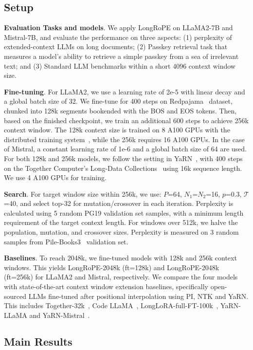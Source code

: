  \label{sec:exp}
\subsection{Setup}
\textbf{Evaluation Tasks and models}. We apply LongRoPE on LLaMA2-7B and Mistral-7B, and evaluate the performance on three aspects: (1) perplexity of extended-context LLMs on long documents; (2) Passkey retrieval task that measures a model's ability to retrieve a simple passkey from a sea of irrelevant text; and (3) Standard LLM benchmarks within a short 4096 context window size. 

\textbf{Fine-tuning}. For LLaMA2, we use a learning rate of 2e-5 with linear decay and a global batch size of 32. We fine-tune for 400 steps on  Redpajama~\cite{redpajama} dataset, chunked into  128k segments bookended with the BOS and EOS tokens. Then, based on the finished checkpoint, we train an additional 600 steps to achieve 256k context window. The 128k context size is trained on 8 A100 GPUs with the distributed training system~\cite{cube}, while the 256k requires 16 A100 GPUs. In the case of Mistral, a constant learning rate of 1e-6 and a global batch size of 64 are used. For both 128k and 256k  models, we follow the setting in YaRN~\cite{yarn}, with  400 steps on the Together Computer's Long-Data Collections~\cite{mistraldata} using 16k sequence length. We use 4 A100 GPUs for training.

\textbf{Search}. For target window size within 256k, we use:  $P$=64, $N_1$=$N_2$=16, $p$=0.3, $\mathcal{T}$=40, and select top-32 for mutation/crossover in each iteration. Perplexity is calculated using 5 random PG19 validation set samples, with a minimum length requirement of the target context length. For windows over 512k, we halve the population, mutation, and crossover sizes. Perplexity is measured on 3 random samples from Pile-Books3~\cite{pile} validation set. 

\textbf{Baselines}. To reach 2048k, we fine-tuned models with 128k and 256k context windows. This yields LongRoPE-2048k (ft=128k) and LongRoPE-2048k (ft=256k) for LLaMA2 and Mistral, respectively. We compare the four models with state-of-the-art context window extension baselines, specifically open-sourced LLMs fine-tuned after positional interpolation using PI, NTK and YaRN.  This includes Together-32k~\cite{together}, Code LLaMA~\cite{codellama}, LongLoRA-full-FT-100k~\cite{longlora}, YaRN-LLaMA and YaRN-Mistral~\cite{yarn}. 

\subsection{Main Results}


